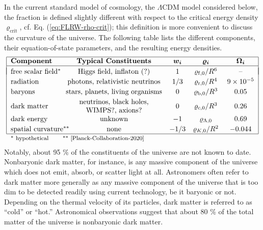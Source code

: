 In the current standard model of cosmology, the $\Lambda$CDM model considered below, the fraction is defined slightly different with respect to the critical energy density $\varrho_{\mathrm{crit}}$, cf. Eq. (\ref{eq:FLRW-rho-crit}); this definition is more convenient to discuss the curvature of the universe. \cite[57]{Ryden-2017}
The following table lists the different components, their equation-of-state parameters, and the resulting energy densities.
\cite[§2.4, p. 470]{Dodelson-Schmidt-2025}
\begin{equation}
	\begin{tabular}{|l@{\!}cccc|}
		\hline
		\textbf{Component} & \textbf{Typical Constituents} & $\fett{w_i}$ & $\fettgr{\varrho_i}$ & $\fettgr{\Omega_i}$
		\\ \hline  & & & & \\[-2.25ex]
		free scalar field$^{*}$ & Higgs field, inflaton (?) & 1 & $\varrho_{\mathrm{f}, 0} / R^{6}$
		& --
		\\ [0.5ex]
		radiation & photons, relativistic neutrinos & $1/3$ & $\varrho_{\mathrm{r}, 0} / R^{4}$ & $9 \times 10^{-5}$
		\\ [0.5ex]
		baryons & stars, planets, living organisms & 0 & $\varrho_{\mathrm{b}, 0} / R^{3}$ & 0.05
		\\ [0.5ex]
		dark matter & 
			\begin{tabular}{@{}c@{}}
				neutrinos, black holes,
				\\
				WIMPS?, axions?
			\end{tabular}
		& 0 & $\varrho_{\mathrm{c}, 0} / R^{3}$ & 0.26
		\\ [0.5ex]
		dark energy & unknown & $-1$ & $\varrho_{\Lambda, 0}$ & 0.69
		\\ [0.5ex]
		spatial curvature$^{**}$\!\! & none & \!$-1/3$\! & $\varrho_{K,0}/R^2$ & $-0.044$
		\\ \hline
		\multicolumn{4}{l}{\footnotesize
			$^{*}$ hypothetical \qquad
			$^{**}$ \cite[Eq. (46b)]{Planck-Collaboration-2020}
		}
	\end{tabular}
	\label{eq:FLRW-different-components-universe-energy-densities}
\end{equation}
Notably, about 95 \% of the constituents of the universe are not known to date. Nonbaryonic dark matter, for instance, is any massive component of the universe which does not emit, absorb, or scatter light at all. Astronomers often refer to dark matter more generally as any massive component of the universe that is too dim to be detected readily using current technology, be it baryonic or not. \cite[23]{Ryden-2017}  Depending on the thermal velocity of its particles, dark matter is referred to as “cold” or “hot.” \cite[221]{Ryden-2017} Astronomical observations suggest that about 80 \% of the total matter of the universe is nonbaryonic dark matter. \cite[43]{Dodelson-Schmidt-2025}
